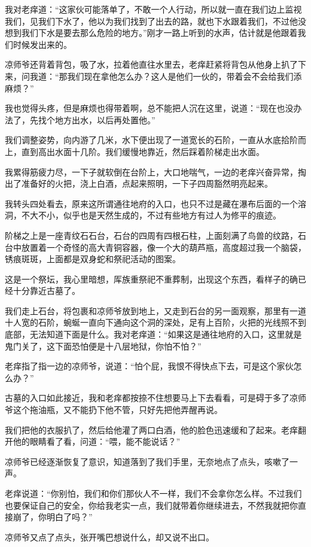 我对老痒道：“这家伙可能落单了，不敢一个人行动，所以就一直在我们边上监视我们，见我们下水了，他以为我们找到了出去的路，就也下水跟着我们，不过他没想到我们下水是要去那么危险的地方。”刚才一路上听到的水声，估计就是他跟着我们时候发出来的。

凉师爷还背着背包，吸了水，拉着他直往水里去，老痒赶紧将背包从他身上扒了下来，问我道：“那我们现在拿他怎么办？这人是他们一伙的，带着会不会给我们添麻烦？”

我也觉得头疼，但是麻烦也得带着啊，总不能把人沉在这里，说道：“现在也没办法了，先找个地方出水，以后再处置他。”

我们调整姿势，向内游了几米，水下便出现了一道宽长的石阶，一直从水底拾阶而上，直到高出水面十几阶。我们缓慢地靠近，然后踩着阶梯走出水面。

我累得筋疲力尽，一下子就软倒在台阶上，大口地喘气，一边的老痒兴奋异常，掏出了准备好的火把，浇上白酒，点起来照明，一下子四周豁然明亮起来。

我转头四处看去，原来这所谓通往地府的入口，也只不过是藏在瀑布后面的一个溶洞，不大不小，似乎也是天然生成的，不过有些地方有过人为修平的痕迹。

阶梯之上是一座青纹石石台，石台的四周有四根石柱，上面刻满了鸟兽的纹路，石台中放置着一个奇怪的高大青铜容器，像一个大的葫芦瓶，高度超过我一个脑袋，锈痕斑斑，上面都是双身蛇和祭祀活动的图案。

这是一个祭坛，我心里暗想，厍族重祭祀不重葬制，出现这个东西，看样子的确已经十分靠近古墓了。

我们走上石台，将包裹和凉师爷放到地上，又走到石台的另一面观察，那里有一道十人宽的石阶，蜿蜒一直向下通向这个洞的深处，足有上百阶，火把的光线照不到底部，无法知道下面是什么。我对老痒道：“如果这是通往地府的入口，这里就是鬼门关了，这下面恐怕便是十八层地狱，你怕不怕？”

老痒指了指一边的凉师爷，说道：“怕个屁，我恨不得快点下去，可是这个家伙怎么办？”

古墓的入口如此接近，我和老痒都按捺不住想要马上下去看看，可是碍于多了凉师爷这个拖油瓶，又不能扔下他不管，只好先把他弄醒再说。

我们把他的衣服扒了，然后给他灌了两口白酒，他的脸色迅速缓和了起来。老痒翻开他的眼睛看了看，问道：“喂，能不能说话？”

凉师爷已经逐渐恢复了意识，知道落到了我们手里，无奈地点了点头，咳嗽了一声。

老痒说道：“你别怕，我们和你们那伙人不一样，我们不会拿你怎么样。不过我们也要保证自己的安全，你给我老实一点，我们就带着你继续进去，不然我就把你直接崩了，你明白了吗？”

凉师爷又点了点头，张开嘴巴想说什么，却又说不出口。

